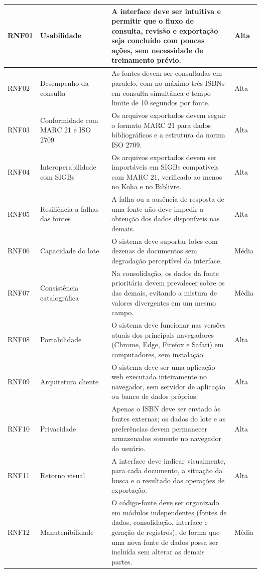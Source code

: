 \begin{longtable}{|p{}|p{}|p{}|p{}|}
    RNF01 & Usabilidade & A interface deve ser intuitiva e permitir que o fluxo de consulta, revisão e exportação seja concluído com poucas ações, sem necessidade de treinamento prévio. & Alta \\ \hline
    RNF02 & Desempenho da consulta & As fontes devem ser consultadas em paralelo, com no máximo três ISBNs em consulta simultânea e tempo limite de 10 segundos por fonte. & Alta \\ \hline
    RNF03 & Conformidade com MARC 21 e ISO 2709 & Os arquivos exportados devem seguir o formato MARC 21 para dados bibliográficos e a estrutura da norma ISO 2709. & Alta \\ \hline
    RNF04 & Interoperabilidade com SIGBs & Os arquivos exportados devem ser importáveis em SIGBs compatíveis com MARC 21, verificado ao menos no Koha e no Biblivre. & Alta \\ \hline
    RNF05 & Resiliência a falhas das fontes & A falha ou a ausência de resposta de uma fonte não deve impedir a obtenção dos dados disponíveis nas demais. & Alta \\ \hline
    RNF06 & Capacidade do lote & O sistema deve suportar lotes com dezenas de documentos sem degradação perceptível da interface. & Média \\ \hline
    RNF07 & Consistência catalográfica & Na consolidação, os dados da fonte prioritária devem prevalecer sobre os das demais, evitando a mistura de valores divergentes em um mesmo campo. & Média \\ \hline
    RNF08 & Portabilidade & O sistema deve funcionar nas versões atuais dos principais navegadores (Chrome, Edge, Firefox e Safari) em computadores, sem instalação. & Alta \\ \hline
    RNF09 & Arquitetura cliente & O sistema deve ser uma aplicação web executada inteiramente no navegador, sem servidor de aplicação ou banco de dados próprios. & Alta \\ \hline
    RNF10 & Privacidade & Apenas o ISBN deve ser enviado às fontes externas; os dados do lote e as preferências devem permanecer armazenados somente no navegador do usuário. & Alta \\ \hline
    RNF11 & Retorno visual & A interface deve indicar visualmente, para cada documento, a situação da busca e o resultado das operações de exportação. & Alta \\ \hline
    RNF12 & Manutenibilidade & O código-fonte deve ser organizado em módulos independentes (fontes de dados, consolidação, interface e geração de registros), de forma que uma nova fonte de dados possa ser incluída sem alterar as demais partes. & Média \\ \hline
\end{longtable}
